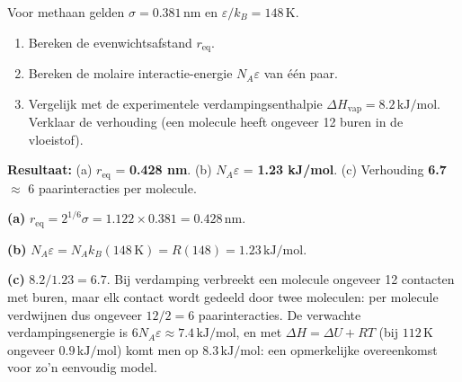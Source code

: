 \begin{oefening}\label{oef:h4-3}
Voor methaan gelden \(\sigma = 0.381\,\mathrm{nm}\) en \(\varepsilon/k_B = 148\,\mathrm{K}\).

\begin{enumerate}
\item[(a)]
  Bereken de evenwichtsafstand \(r_{\text{eq}}\).
\item[(b)]
  Bereken de molaire interactie-energie \(N_A\varepsilon\) van één paar.
\item[(c)]
  Vergelijk met de experimentele verdampingsenthalpie \(\Delta H_{\text{vap}} = 8.2\,\mathrm{kJ/mol}\). Verklaar de verhouding (een molecule heeft ongeveer 12 buren in de vloeistof).
\end{enumerate}
\end{oefening}
\begin{oplossing}
\textbf{Resultaat:} (a) \(r_{\text{eq}}\) = \textbf{0.428 nm}. (b) \(N_A\varepsilon\) = \textbf{1.23 kJ/mol}. (c) Verhouding \textbf{6.7} \ensuremath{\approx{}} 6 paarinteracties per molecule.

\textbf{(a)} \(r_{\text{eq}} = 2^{1/6}\sigma = 1.122 \times 0.381 = 0.428\,\mathrm{nm}\).

\textbf{(b)} \(N_A\varepsilon = N_A k_B (148\,\mathrm{K}) = R(148) = 1.23\,\mathrm{kJ/mol}\).

\textbf{(c)} \(8.2/1.23 = 6.7\). Bij verdamping verbreekt een molecule ongeveer 12 contacten met buren, maar elk contact wordt gedeeld door twee moleculen: per molecule verdwijnen dus ongeveer \(12/2 = 6\) paarinteracties. De verwachte verdampingsenergie is \(6 N_A\varepsilon \approx 7.4\,\mathrm{kJ/mol}\), en met \(\Delta H = \Delta U + RT\) (bij \(112\,\mathrm{K}\) ongeveer \(0.9\,\mathrm{kJ/mol}\)) komt men op \(8.3\,\mathrm{kJ/mol}\): een opmerkelijke overeenkomst voor zo'n eenvoudig model.
\end{oplossing}

